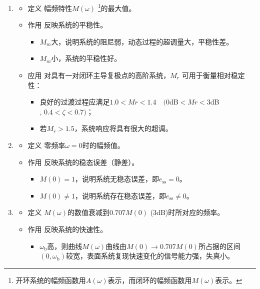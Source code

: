 \begin{enumerate}[1. ]
		\item {}
			\begin{itemize}
				\item 定义 \quad 幅频特性$M(\omega)$
				\footnote[1]{开环系统的幅频函数用$A(\omega)$表示，而闭环的幅频函数用$M(\omega)$表示。}的最大值。
				\item 作用 \quad 反映系统的平稳性。
				\begin{itemize}
					\item $M_m$大，说明系统的阻尼弱，动态过程的超调量大，平稳性差。
					\item $M_m$小，系统的平稳性好。
				\end{itemize}
				\item 应用 \quad 对具有一对闭环主导复极点的高阶系统，$M_r$ 可用于衡量相对稳定性：
				\begin{itemize}
					\item 良好的过渡过程应满足$1.0<Mr<1.4\quad (0$dB$<Mr<3$dB$, \,0.4 <\zeta < 0.7)$；
					\item 若$M_r>1.5$，系统响应将具有很大的超调。
				\end{itemize}
			\end{itemize}
		
		\item {}
			\begin{itemize}
				\item 定义 \quad 零频率$\omega = 0$时的幅频值。
				\item 作用 \quad 反映系统的稳态误差（静差）。
				\begin{itemize}
					\item $M(0) = 1$，说明系统无稳态误差，即$e_{\text{ss}} = 0$。
					\item $M(0) \neq 1$，说明系统存在稳态误差，即$e_{\text{ss}} \neq 0$。
				\end{itemize}
			\end{itemize}
		
		\item {}
		\begin{itemize}
			\item 定义 \quad $M(\omega)$的数值衰减到$0.707M(0)\,\,$(3dB)时所对应的频率。
			\item 作用 \quad 反映系统的快速性。
			\begin{itemize}
				\item $\omega_{\text{b}}$高，则曲线$M(\omega)$曲线由$M(0)\to 0.707 M(0)$所占据的区间$(0, \omega_{\text{b}})$较宽，表面系统复现快速变化的信号能力强，失真小。
			\end{itemize}
		\end{itemize}
		

\end{enumerate}
